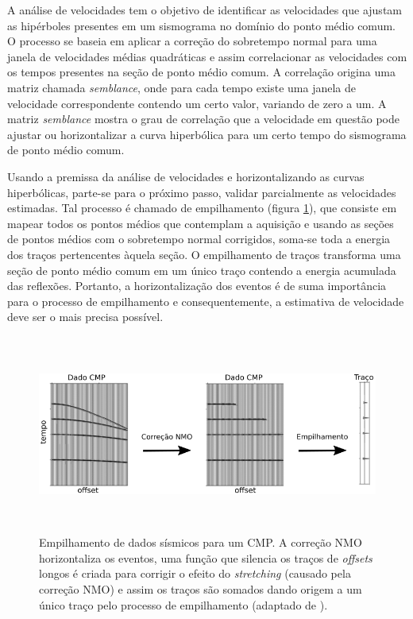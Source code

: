 \documentclass[
	12pt,				%
	openright,			%
	oneside,			%
	a4paper,			%
	english,			%
	brazil				%
	]{abntex2}
\begin{document}
    A análise de velocidades tem o objetivo de identificar as velocidades que ajustam as hipérboles presentes em um sismograma no domínio do ponto médio comum. O processo se baseia em aplicar a correção do sobretempo normal para uma janela de velocidades médias quadráticas e assim correlacionar as velocidades com os tempos presentes na seção de ponto médio comum. A correlação origina uma matriz chamada \textit{semblance}, onde para cada tempo existe uma janela de velocidade correspondente contendo um certo valor, variando de zero a um. A matriz \textit{semblance} mostra o grau de correlação que a velocidade em questão pode ajustar ou horizontalizar a curva hiperbólica para um certo tempo do sismograma de ponto médio comum.
    
    Usando a premissa da análise de velocidades e horizontalizando as curvas hiperbólicas, parte-se para o próximo passo, validar parcialmente as velocidades estimadas. Tal processo é chamado de empilhamento (figura \ref{empilhamento}), que consiste em mapear todos os pontos médios que contemplam a aquisição e usando as seções de pontos médios com o sobretempo normal corrigidos, soma-se toda a energia dos traços pertencentes àquela seção. O empilhamento de traços transforma uma seção de ponto médio comum em um único traço contendo a energia acumulada das reflexões. Portanto, a horizontalização dos eventos é de suma importância para o processo de empilhamento e consequentemente, a estimativa de velocidade deve ser o mais precisa possível.
    
    \begin{figure}[htp!]
    	\centering
    	\includegraphics[width=15cm,height=6.5cm]{../imagens/empilhamento.png}
    	\caption{Empilhamento de dados sísmicos para um CMP. A correção NMO horizontaliza os eventos, uma função que silencia os traços de \textit{offsets} longos é criada para corrigir o efeito do \textit{stretching} (causado pela correção NMO) e assim os traços são somados dando origem a um único traço pelo processo de empilhamento (adaptado de ).}
    	\label{empilhamento}
    \end{figure}
    
\end{document}
